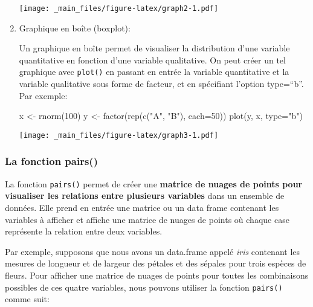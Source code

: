 \documentclass[
]{article}
\newenvironment{Shaded}{\begin{snugshade}}{\end{snugshade}}
\newcommand{\AttributeTok}[1]{\textcolor[rgb]{0.77,0.63,0.00}{#1}}
\newcommand{\DecValTok}[1]{\textcolor[rgb]{0.00,0.00,0.81}{#1}}
\newcommand{\FunctionTok}[1]{\textcolor[rgb]{0.00,0.00,0.00}{#1}}
\newcommand{\NormalTok}[1]{#1}
\newcommand{\OtherTok}[1]{\textcolor[rgb]{0.56,0.35,0.01}{#1}}
\newcommand{\StringTok}[1]{\textcolor[rgb]{0.31,0.60,0.02}{#1}}
\begin{document}
\begin{enumerate}
  \texttt{[image: \_main\_files/figure-latex/graph2-1.pdf]}
\item
  Graphique en boîte (boxplot):

  Un graphique en boîte permet de visualiser la distribution d'une variable quantitative en fonction d'une variable qualitative. On peut créer un tel graphique avec \texttt{plot()} en passant en entrée la variable quantitative et la variable qualitative sous forme de facteur, et en spécifiant l'option type=``b''. Par exemple:

\begin{Shaded}
\begin{Highlighting}[]
\NormalTok{x }\OtherTok{\textless{}{-}} \FunctionTok{rnorm}\NormalTok{(}\DecValTok{100}\NormalTok{)}
\NormalTok{y }\OtherTok{\textless{}{-}} \FunctionTok{factor}\NormalTok{(}\FunctionTok{rep}\NormalTok{(}\FunctionTok{c}\NormalTok{(}\StringTok{"A"}\NormalTok{, }\StringTok{"B"}\NormalTok{), }\AttributeTok{each=}\DecValTok{50}\NormalTok{))}
\FunctionTok{plot}\NormalTok{(y, x, }\AttributeTok{type=}\StringTok{"b"}\NormalTok{)}
\end{Highlighting}
\end{Shaded}

  \texttt{[image: \_main\_files/figure-latex/graph3-1.pdf]}
\end{enumerate}

\hypertarget{la-fonction-pairs}{%
\subsubsection{La fonction pairs()}\label{la-fonction-pairs}}

La fonction \texttt{pairs()} permet de créer une \textbf{matrice de nuages de points pour visualiser les relations entre plusieurs variables} dans un ensemble de données. Elle prend en entrée une matrice ou un data frame contenant les variables à afficher et affiche une matrice de nuages de points où chaque case représente la relation entre deux variables.

Par exemple, supposons que nous avons un data.frame appelé \emph{iris} contenant les mesures de longueur et de largeur des pétales et des sépales pour trois espèces de fleurs. Pour afficher une matrice de nuages de points pour toutes les combinaisons possibles de ces quatre variables, nous pouvons utiliser la fonction \texttt{pairs()} comme suit:
\end{document}
